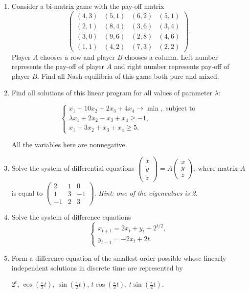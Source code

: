\documentclass[12pt]{article} %
\theoremstyle{definition} %
\begin{document}
\begin{enumerate}
\item Consider a bi-matrix game with the pay-off matrix
\[
\begin{pmatrix}
(4,3) & (5,1) & (6,2) & (5,1)\\
(2,1) & (8,4) & (3,6) & (3,4)\\
(3,0) & (9,6) & (2,8) &(4,6)\\
(1,1) & (4,2) & (7,3) & (2,2)
\end{pmatrix}. 
\]
Player $A$ chooses a row and player $B$ chooses a column. 
Left number represents the pay-off of player $A$ and right number represents pay-off of player $B$. 
Find all Nash equilibria of this game both pure and mixed.

\item Find all solutions of this linear program for all values of parameter $\lambda$:

\[
\begin{cases}
x_1+10x_2+2x_3+4x_4\rightarrow \min,\text{ subject to}\\
\lambda x_1+2x_2-x_3+x_4\geq -1,\\
x_1+3x_2+x_3+x_4\geq 5.
\end{cases}
\]

All the variables here are nonnegative.

\item Solve the system of differential equations 
$\begin{pmatrix}\dot x\\ \dot y \\ \dot z\end{pmatrix}=A\begin{pmatrix} x\\ y \\  z\end{pmatrix}$, 
where matrix $A$  is  equal to $\begin{pmatrix}2 &1 &0\\ 1 &3 &-1 \\ -1 & 2& 3\end{pmatrix}$. \textit{Hint: one of the eigenvalues is 2.}

\item Solve the system of difference equations 
\[
\begin{cases}x_{t+1}=2x_t+y_t+2^{t/2},\\ y_{t+1}=-2x_t+2t.\end{cases}
\]

\item Form a difference equation of the smallest order possible whose linearly independent solutions in discrete time are represented by 
    
    \centerline{$2^t$, $\cos \left(\frac {\pi}2t\right)$, $\sin \left(\frac {\pi}2t\right)$, $t\cos\left(\frac {\pi}2t\right)$, $t\sin\left(\frac {\pi}2t\right)$.}
\end{enumerate}
\end{document}
